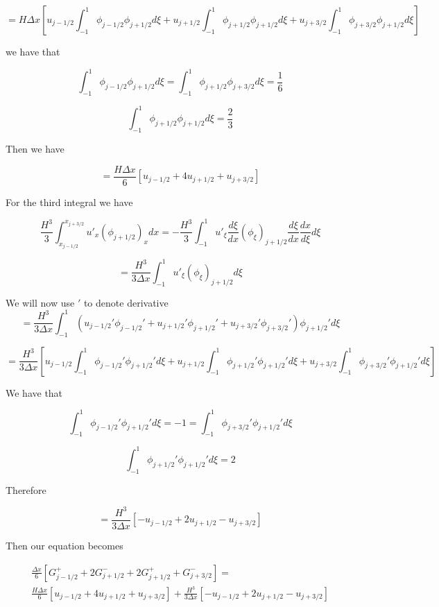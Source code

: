 \documentclass[12pt]{article}
\begin{document}
\[= H\Delta x \left[u_{j- 1/2}\int_{-1}^{1}\phi_{j - 1/2}\phi_{j + 1/2} d\xi + u_{j+1/2}\int_{-1}^{1} \phi_{j+1/2} \phi_{j + 1/2} d\xi + u_{j+3/2}\int_{-1}^{1} \phi_{j+3/2} \phi_{j + 1/2} d\xi \right] \]

we have that 

\[\int_{-1}^{1} \phi_{j - 1/2}\phi_{j+1/2} d\xi =  \int_{-1}^{1} \phi_{j + 1/2}\phi_{j+3/2} d\xi = \frac{1}{6}\]

\[\int_{-1}^{1} \phi_{j + 1/2}\phi_{j+1/2} d\xi= \frac{2}{3}\] 

Then we have 

\[=  \frac{H\Delta x}{6} \left[u_{j- 1/2} + 4u_{j+1/2} + u_{j+3/2}\right] \]

For the third integral we have 

\[\frac{H^3}{3}\int_{x_{j-1/2}}^{x_{j+3/2}}u'_{x}(\phi_{j+1/2})_{x}dx = -\frac{H^3}{3}\int_{-1}^{1}u'_{\xi}\frac{d \xi }{dx}(\phi_{\xi})_{j+1/2}\frac{d \xi }{dx} \frac{d x}{d\xi} d\xi   \]

\[= \frac{H^3}{3\Delta x}\int_{-1}^{1}u'_{\xi}(\phi_{\xi})_{j+1/2} d\xi   \]

We will now use $'$ to denote derivative
\[= \frac{H^3}{3\Delta x}\int_{-1}^{1}\left(u_{j- 1/2}'\phi_{j - 1/2}' + u_{j+1/2}'\phi_{j+1/2}' +u_{j+ 3/2}'\phi_{j+ 3/2}' \right)\phi_{j+1/2}' d\xi   \]

\[= \frac{H^3}{3\Delta x}\left[u_{j- 1/2} \int_{-1}^{1} \phi_{j - 1/2}'\phi_{j+1/2}' d\xi + u_{j+1/2} \int_{-1}^{1} \phi_{j+1/2}'\phi_{j+1/2}' d\xi +  u_{j+3/2} \int_{-1}^{1} \phi_{j  +3/2}'\phi_{j+1/2}' d\xi\right]   \]

We have that 

\[\int_{-1}^{1} \phi_{j-1/2}'\phi_{j+1/2}' d\xi = -1 = \int_{-1}^{1} \phi_{j+3/2}'\phi_{j+1/2}' d\xi \]

\[\int_{-1}^{1} \phi_{j+1/2}'\phi_{j+1/2}' d\xi = 2\]

Therefore

\[= \frac{H^3}{3\Delta x}\left[-u_{j- 1/2}  + 2u_{j+1/2} -  u_{j+3/2} \right]   \]

Then our equation becomes

\begin{multline}
\frac{\Delta x}{6}  \left[G^+_{j- 1/2} +  2G^-_{j+ 1/2} +  2G^+_{j+ 1/2}  +  G^-_{j+ 3/2}\right] = \\ \frac{H\Delta x}{6} \left[u_{j- 1/2} + 4u_{j+1/2} + u_{j+3/2}\right] +  \frac{H^3}{3\Delta x}\left[-u_{j- 1/2}  + 2u_{j+1/2} -  u_{j+3/2} \right]
\end{multline}
\end{document}
